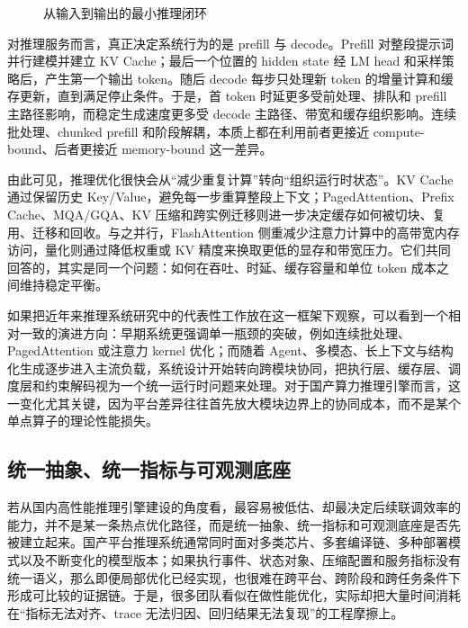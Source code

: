 \begin{figure}[t]
\centering
\resizebox{0.97\linewidth}{!}{}
\caption{从输入到输出的最小推理闭环}
\label{fig:minimal-inference-loop}
\end{figure}

对推理服务而言，真正决定系统行为的是 prefill 与 decode。Prefill 对整段提示词并行建模并建立 KV Cache；最后一个位置的 hidden state 经 LM head 和采样策略后，产生第一个输出 token。随后 decode 每步只处理新 token 的增量计算和缓存更新，直到满足停止条件。于是，首 token 时延更多受前处理、排队和 prefill 主路径影响，而稳定生成速度更多受 decode 主路径、带宽和缓存组织影响。连续批处理、chunked prefill 和阶段解耦，本质上都在利用前者更接近 compute-bound、后者更接近 memory-bound 这一差异\citep{orca2023,sarathi2023,zhong2024distserve,splitwise2024}。

由此可见，推理优化很快会从“减少重复计算”转向“组织运行时状态”。KV Cache 通过保留历史 Key/Value，避免每一步重算整段上下文；PagedAttention、Prefix Cache、MQA/GQA、KV 压缩和跨实例迁移则进一步决定缓存如何被切块、复用、迁移和回收\citep{kwon2023efficient,liu2024kivi,li2024snapkv}。与之并行，FlashAttention 侧重减少注意力计算中的高带宽内存访问，量化则通过降低权重或 KV 精度来换取更低的显存和带宽压力\citep{dao2022flashattention,dao2024flashattention2,shah2024flashattention3,wang2024qserve}。它们共同回答的，其实是同一个问题：如何在吞吐、时延、缓存容量和单位 token 成本之间维持稳定平衡。

如果把近年来推理系统研究中的代表性工作放在这一框架下观察，可以看到一个相对一致的演进方向：早期系统更强调单一瓶颈的突破，例如连续批处理、PagedAttention 或注意力 kernel 优化；而随着 Agent、多模态、长上下文与结构化生成逐步进入主流负载，系统设计开始转向跨模块协同，把执行层、缓存层、调度层和约束解码视为一个统一运行时问题来处理\citep{orca2023,kwon2023efficient,dao2022flashattention,dong2024xgrammar,liu2025elasticmm}。对于国产算力推理引擎而言，这一变化尤其关键，因为平台差异往往首先放大模块边界上的协同成本，而不是某个单点算子的理论性能损失。

\subsection{统一抽象、统一指标与可观测底座}

若从国内高性能推理引擎建设的角度看，最容易被低估、却最决定后续联调效率的能力，并不是某一条热点优化路径，而是统一抽象、统一指标和可观测底座是否先被建立起来。国产平台推理系统通常同时面对多类芯片、多套编译链、多种部署模式以及不断变化的模型版本；如果执行事件、状态对象、压缩配置和服务指标没有统一语义，那么即便局部优化已经实现，也很难在跨平台、跨阶段和跨任务条件下形成可比较的证据链。于是，很多团队看似在做性能优化，实际却把大量时间消耗在“指标无法对齐、trace 无法归因、回归结果无法复现”的工程摩擦上。

